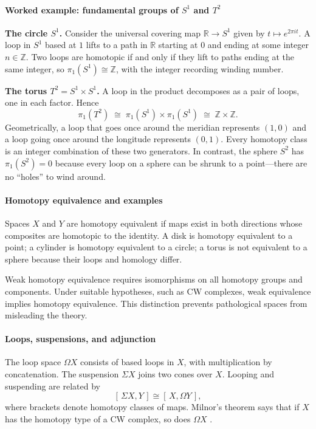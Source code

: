 \paragraph{Worked example: fundamental groups of $S^1$ and $T^2$}
\textbf{The circle $S^1$.} Consider the universal covering map $\mathbb{R}\to S^1$ given by $t\mapsto e^{2\pi i t}$. A loop in $S^1$ based at $1$ lifts to a path in $\mathbb{R}$ starting at $0$ and ending at some integer $n\in\mathbb{Z}$. Two loops are homotopic if and only if they lift to paths ending at the same integer, so $\pi_1(S^1)\cong\mathbb{Z}$, with the integer recording winding number.

\textbf{The torus $T^2=S^1\times S^1$.} A loop in the product decomposes as a pair of loops, one in each factor. Hence
\[
\pi_1(T^2)\;\cong\;\pi_1(S^1)\times\pi_1(S^1)\;\cong\;\mathbb{Z}\times\mathbb{Z}.
\]
Geometrically, a loop that goes once around the meridian represents $(1,0)$ and a loop going once around the longitude represents $(0,1)$. Every homotopy class is an integer combination of these two generators. In contrast, the sphere $S^2$ has $\pi_1(S^2)=0$ because every loop on a sphere can be shrunk to a point---there are no ``holes'' to wind around.

\paragraph{Homotopy equivalence and examples}
Spaces $X$ and $Y$ are homotopy equivalent if maps exist in both directions whose composites are homotopic to the identity. A disk is homotopy equivalent to a point; a cylinder is homotopy equivalent to a circle; a torus is not equivalent to a sphere because their loops and homology differ.

Weak homotopy equivalence requires isomorphisms on all homotopy groups and components. Under suitable hypotheses, such as CW complexes, weak equivalence implies homotopy equivalence. This distinction prevents pathological spaces from misleading the theory.

\paragraph{Loops, suspensions, and adjunction}
The loop space $\Omega X$ consists of based loops in $X$, with multiplication by concatenation. The suspension $\Sigma X$ joins two cones over $X$. Looping and suspending are related by
\[
[\,\Sigma X,Y\,]\cong[\,X,\Omega Y\,],
\]
where brackets denote homotopy classes of maps. Milnor's theorem says that if $X$ has the homotopy type of a CW complex, so does $\Omega X$ \cite{homotopy_theory_ref2}.

